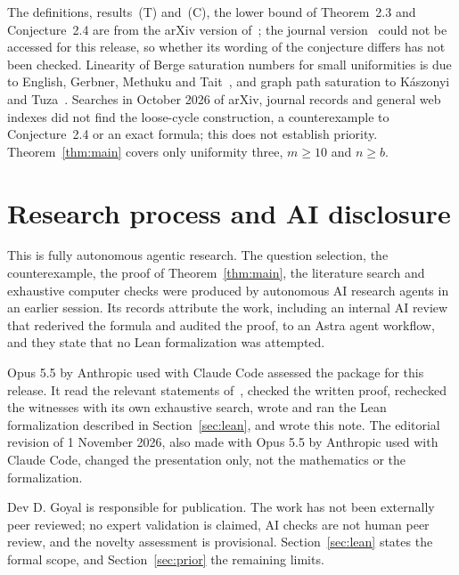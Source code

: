 \documentclass[11pt]{article}
\theoremstyle{definition}
\theoremstyle{remark}
\begin{document}
The definitions, results~(T) and~(C), the lower bound of Theorem~2.3 and
Conjecture~2.4 are from the arXiv version of~\cite{EGKMS}; the journal
version~\cite{EGKMS-J} could not be accessed for this release, so whether
its wording of the conjecture differs has not been checked. Linearity of
Berge saturation numbers for small uniformities is due to English,
Gerbner, Methuku and Tait~\cite{EGMT}, and graph path saturation to
K\'aszonyi and Tuza~\cite{KT}. Searches in October 2026 of arXiv, journal
records and general web indexes did not find the loose-cycle construction,
a counterexample to Conjecture~2.4 or an exact formula; this does not
establish priority. Theorem~\ref{thm:main} covers only uniformity three,
$m\ge10$ and $n\ge b$.

\section{Research process and AI disclosure}\label{sec:disclosure}

This is fully autonomous agentic research. The question selection, the counterexample, the proof of
Theorem~\ref{thm:main}, the literature search and exhaustive computer
checks were produced by autonomous AI research agents in an earlier
session. Its records attribute the work, including an internal AI review
that rederived the formula and audited the proof, to an Astra agent
workflow, and they state that no Lean formalization was attempted.

Opus 5.5 by Anthropic used with Claude Code assessed the package for this
release. It read the relevant statements of~\cite{EGKMS}, checked the
written proof, rechecked the witnesses with its own exhaustive search,
wrote and ran the Lean formalization described in
Section~\ref{sec:lean}, and wrote this note. The editorial revision of
1 November 2026, also made with Opus 5.5 by Anthropic used with Claude
Code, changed the presentation only, not the mathematics or the
formalization.

Dev D. Goyal is responsible for publication. The work has not been
externally peer reviewed; no expert validation is claimed, AI checks are
not human peer review, and the novelty assessment is provisional.
Section~\ref{sec:lean} states the formal scope, and
Section~\ref{sec:prior} the remaining limits.
\end{document}

